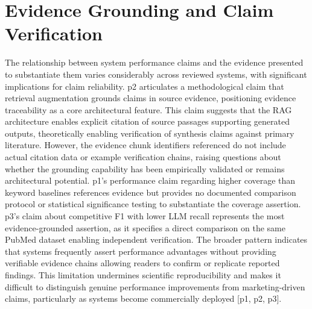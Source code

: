 \documentclass{article}
\begin{document}
\section{Evidence Grounding and Claim Verification}
The relationship between system performance claims and the evidence presented to substantiate them varies considerably across reviewed systems, with significant implications for claim reliability. p2 articulates a methodological claim that retrieval augmentation grounds claims in source evidence, positioning evidence traceability as a core architectural feature. This claim suggests that the RAG architecture enables explicit citation of source passages supporting generated outputs, theoretically enabling verification of synthesis claims against primary literature. However, the evidence chunk identifiers referenced do not include actual citation data or example verification chains, raising questions about whether the grounding capability has been empirically validated or remains architectural potential. p1's performance claim regarding higher coverage than keyword baselines references evidence but provides no documented comparison protocol or statistical significance testing to substantiate the coverage assertion. p3's claim about competitive F1 with lower LLM recall represents the most evidence-grounded assertion, as it specifies a direct comparison on the same PubMed dataset enabling independent verification. The broader pattern indicates that systems frequently assert performance advantages without providing verifiable evidence chains allowing readers to confirm or replicate reported findings. This limitation undermines scientific reproducibility and makes it difficult to distinguish genuine performance improvements from marketing-driven claims, particularly as systems become commercially deployed [p1, p2, p3].
\end{document}
